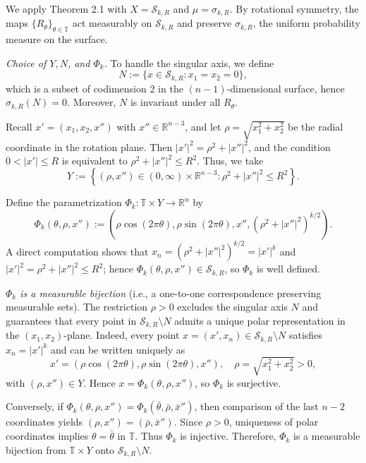 \documentclass[11pt]{article}
\numberwithin{equation}{section}
\theoremstyle{remark}
\begin{document}
We apply Theorem 2.1 with $X = \mathcal{S}_{k,R}$ and $\mu = \sigma_{k,R}$. By rotational symmetry, the maps $\{R_\theta\}_{\theta \in \mathbb{T}}$ act measurably on $\mathcal{S}_{k,R}$ and preserve $\sigma_{k,R}$, the uniform probability measure on the surface.

\emph{Choice of $Y, N$, and $\Phi_k$.} To handle the singular axis, we define
\[ N := \{x \in \mathcal{S}_{k,R} : x_1 = x_2 = 0\}, \]
which is a subset of codimension 2 in the $(n-1)$-dimensional surface, hence $\sigma_{k,R}(N) = 0$. Moreover, $N$ is invariant under all $R_\theta$.

Recall $x'= (x_1, x_2, x'')$ with $x'' \in \mathbb{R}^{n-3}$, and let $\rho = \sqrt{x_1^2 + x_2^2}$ be the radial coordinate in the rotation plane. Then $|x'|^2 = \rho^2 + |x''|^2$, and the condition $0 < |x'| \le R$ is equivalent to $\rho^2 + |x''|^2 \le R^2$. Thus, we take
\begin{equation}\label{definition-Y}
Y := \left\{(\rho, x'') \in (0, \infty) \times \mathbb{R}^{n-3} : \rho^2 + |x''|^2 \le R^2\right\}.
\end{equation}

Define the parametrization $\Phi_k : \mathbb{T} \times Y \rightarrow \mathbb{R}^n$ by
\begin{equation}\label{definition:Phi_k-paraboloid}
\Phi_k(\theta, \rho, x'') := \left(\rho \cos(2\pi\theta), \rho \sin(2\pi\theta), x'', (\rho^2 + |x''|^2)^{k/2}\right).
\end{equation}
A direct computation shows that $x_n = (\rho^2 + |x''|^2)^{k/2} = |x'|^k$ and $|x'|^2 = \rho^2 + |x''|^2 \le R^2$; hence $\Phi_k(\theta, \rho, x'') \in \mathcal{S}_{k,R}$, so $\Phi_k$ is well defined.

\emph{$\Phi_k$ is a measurable bijection} (i.e., a one-to-one correspondence preserving measurable sets).
The restriction $\rho > 0$ excludes the singular axis $N$ and guarantees that every point in $\mathcal{S}_{k,R} \setminus N$ admits a unique polar representation in the $(x_1, x_2)$-plane. Indeed, every point $x = (x', x_n) \in \mathcal{S}_{k,R} \setminus N$ satisfies $x_n = |x'|^k$ and can be written uniquely as
\[ x' = (\rho \cos(2\pi\theta), \rho \sin(2\pi\theta), x''), \quad \rho = \sqrt{x_1^2 + x_2^2} > 0, \]
with $(\rho, x'') \in Y$. Hence $x = \Phi_k(\theta, \rho, x'')$, so $\Phi_k$ is surjective.

Conversely, if $\Phi_k(\theta, \rho, x'') = \Phi_k(\bar\theta, \bar\rho, \bar{x}'')$, then comparison of the last $n-2$ coordinates yields $(\rho, x'') = (\bar\rho, \bar{x}'')$. Since $\rho > 0$, uniqueness of polar coordinates implies $\theta = \bar\theta$ in $\mathbb{T}$. Thus $\Phi_k$ is injective. Therefore, $\Phi_k$ is a measurable bijection from $\mathbb{T} \times Y$ onto $\mathcal{S}_{k,R} \setminus N$.
\end{document}
